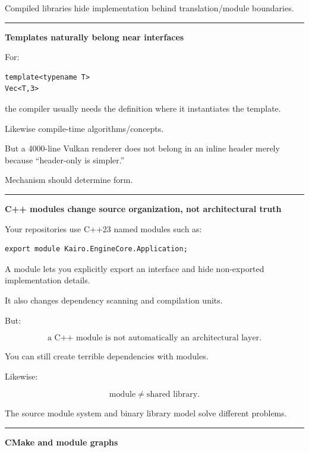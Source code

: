 Compiled libraries hide implementation behind translation/module boundaries.

\begin{center}\rule{0.5\linewidth}{0.5pt}\end{center}

\textbf{Templates naturally belong near interfaces}

For:

\begin{verbatim}
template<typename T>
Vec<T,3>
\end{verbatim}

the compiler usually needs the definition where it instantiates the template.

Likewise compile-time algorithms/concepts.

But a 4000-line Vulkan renderer does not belong in an inline header merely because ``header-only is simpler.''

Mechanism should determine form.

\begin{center}\rule{0.5\linewidth}{0.5pt}\end{center}

\textbf{C++ modules change source organization, not architectural truth}

Your repositories use C++23 named modules such as:

\begin{verbatim}
export module Kairo.EngineCore.Application;
\end{verbatim}

A module lets you explicitly export an interface and hide non-exported implementation details.

It also changes dependency scanning and compilation units.

But:

\[
\boxed{
\text{a C++ module is not automatically an architectural layer}.
}
\]

You can still create terrible dependencies with modules.

Likewise:

\[
\boxed{
\text{module} \neq \text{shared library}.
}
\]

The source module system and binary library model solve different problems.

\begin{center}\rule{0.5\linewidth}{0.5pt}\end{center}

\textbf{CMake and module graphs}

